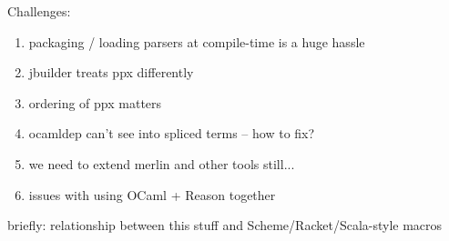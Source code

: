 \documentclass[acmsmall,review]{acmart}
\theoremstyle{slplain}
\numberwithin{thm}{section}
\begin{document}
Challenges:
\begin{enumerate}
  \item packaging / loading parsers at compile-time is a huge hassle
  \item jbuilder treats ppx differently
  \item ordering of ppx matters
  \item ocamldep can't see into spliced terms -- how to fix?
  \item we need to extend merlin and other tools still...
  \item issues with using OCaml + Reason together
\end{enumerate}

briefly: relationship between this stuff and Scheme/Racket/Scala-style macros



% 
\end{document}
